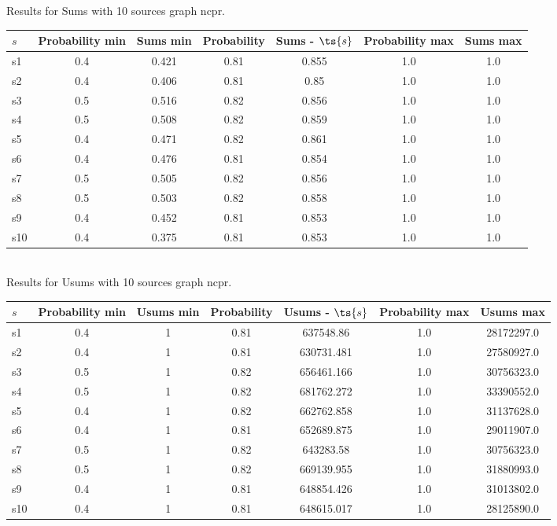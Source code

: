 \documentclass{article}
\begin{document}
\noindent Results for Sums with 10 sources graph ncpr.

\noindent\begin{tabular}{|l|c|c|c|c|c|c|}
\hline
$s$& Probability min & Sums min & Probability & Sums - $\ts{s}$ & Probability max & Sums max\\
\hline
s1 &0.4 & 0.421 & 0.81 & 0.855 & 1.0 & 1.0\\
\hline
s2 &0.4 & 0.406 & 0.81 & 0.85 & 1.0 & 1.0\\
\hline
s3 &0.5 & 0.516 & 0.82 & 0.856 & 1.0 & 1.0\\
\hline
s4 &0.5 & 0.508 & 0.82 & 0.859 & 1.0 & 1.0\\
\hline
s5 &0.4 & 0.471 & 0.82 & 0.861 & 1.0 & 1.0\\
\hline
s6 &0.4 & 0.476 & 0.81 & 0.854 & 1.0 & 1.0\\
\hline
s7 &0.5 & 0.505 & 0.82 & 0.856 & 1.0 & 1.0\\
\hline
s8 &0.5 & 0.503 & 0.82 & 0.858 & 1.0 & 1.0\\
\hline
s9 &0.4 & 0.452 & 0.81 & 0.853 & 1.0 & 1.0\\
\hline
s10 &0.4 & 0.375 & 0.81 & 0.853 & 1.0 & 1.0\\
\hline
\end{tabular}\\

\noindent Results for Usums with 10 sources graph ncpr.

\noindent\begin{tabular}{|l|c|c|c|c|c|c|}
\hline
$s$& Probability min & Usums min & Probability & Usums - $\ts{s}$ & Probability max & Usums max\\
\hline
s1 &0.4 & 1 & 0.81 & 637548.86 & 1.0 & 28172297.0\\
\hline
s2 &0.4 & 1 & 0.81 & 630731.481 & 1.0 & 27580927.0\\
\hline
s3 &0.5 & 1 & 0.82 & 656461.166 & 1.0 & 30756323.0\\
\hline
s4 &0.5 & 1 & 0.82 & 681762.272 & 1.0 & 33390552.0\\
\hline
s5 &0.4 & 1 & 0.82 & 662762.858 & 1.0 & 31137628.0\\
\hline
s6 &0.4 & 1 & 0.81 & 652689.875 & 1.0 & 29011907.0\\
\hline
s7 &0.5 & 1 & 0.82 & 643283.58 & 1.0 & 30756323.0\\
\hline
s8 &0.5 & 1 & 0.82 & 669139.955 & 1.0 & 31880993.0\\
\hline
s9 &0.4 & 1 & 0.81 & 648854.426 & 1.0 & 31013802.0\\
\hline
s10 &0.4 & 1 & 0.81 & 648615.017 & 1.0 & 28125890.0\\
\hline
\end{tabular}\\
\end{document}
